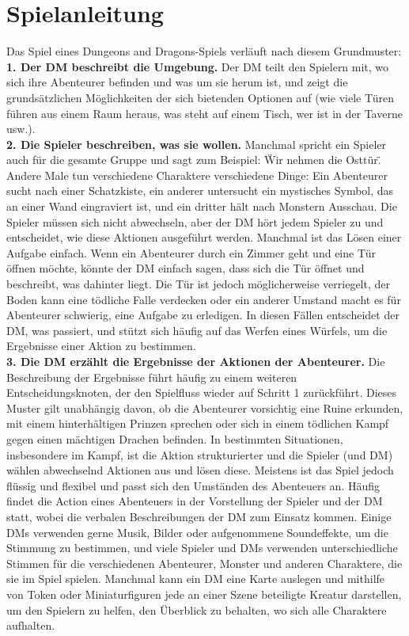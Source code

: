 \section{Spielanleitung}
Das Spiel eines Dungeons and Dragons-Spiels verläuft nach diesem Grundmuster:\\
\textbf{1. Der DM beschreibt die Umgebung.} Der DM teilt den Spielern mit, wo sich ihre Abenteurer befinden und was um sie herum ist, und zeigt die grundsätzlichen Möglichkeiten der sich bietenden Optionen auf (wie viele Türen führen aus einem Raum heraus, was steht auf einem Tisch, wer ist in der Taverne usw.).\\
\textbf{2. Die Spieler beschreiben, was sie wollen.}
Manchmal spricht ein Spieler auch für die gesamte Gruppe und sagt zum Beispiel: \"Wir nehmen die Osttür\". Andere Male tun verschiedene Charaktere verschiedene Dinge: Ein Abenteurer sucht nach einer Schatzkiste, ein anderer untersucht ein mystisches Symbol, das an einer Wand eingraviert ist, und ein dritter hält nach Monstern Ausschau. Die Spieler müssen sich nicht abwechseln, aber der DM hört jedem Spieler zu und entscheidet, wie diese Aktionen ausgeführt werden. Manchmal ist das Lösen einer Aufgabe einfach. Wenn ein Abenteurer durch ein Zimmer geht und eine Tür öffnen möchte, könnte der DM einfach sagen, dass sich die Tür öffnet und beschreibt, was dahinter liegt. Die Tür ist jedoch möglicherweise verriegelt, der Boden kann eine tödliche Falle verdecken oder ein anderer Umstand macht es für Abenteurer schwierig, eine Aufgabe zu erledigen. In diesen Fällen entscheidet der DM, was passiert, und stützt sich häufig auf das Werfen eines Würfels, um die Ergebnisse einer Aktion zu bestimmen.\\
\textbf{3. Die DM erzählt die Ergebnisse der Aktionen der Abenteurer.}
Die Beschreibung der Ergebnisse führt häufig zu einem weiteren Entscheidungsknoten, der den Spielfluss wieder auf Schritt 1 zurückführt. Dieses Muster gilt unabhängig davon, ob die Abenteurer vorsichtig eine Ruine erkunden, mit einem hinterhältigen Prinzen sprechen oder sich in einem tödlichen Kampf gegen einen mächtigen Drachen befinden. In bestimmten Situationen, insbesondere im Kampf, ist die Aktion strukturierter und die Spieler (und DM) wählen abwechselnd Aktionen aus und lösen diese. Meistens ist das Spiel jedoch flüssig und flexibel und passt sich den Umständen des Abenteuers an. Häufig findet die Action eines Abenteuers in der Vorstellung der Spieler und der DM statt, wobei die verbalen Beschreibungen der DM zum Einsatz kommen. Einige DMs verwenden gerne Musik, Bilder oder aufgenommene Soundeffekte, um die Stimmung zu bestimmen, und viele Spieler und DMs verwenden unterschiedliche Stimmen für die verschiedenen Abenteurer, Monster und anderen Charaktere, die sie im Spiel spielen. Manchmal kann ein DM eine Karte auslegen und mithilfe von Token oder Miniaturfiguren jede an einer Szene beteiligte Kreatur darstellen, um den Spielern zu helfen, den Überblick zu behalten, wo sich alle Charaktere aufhalten.
\newpage
